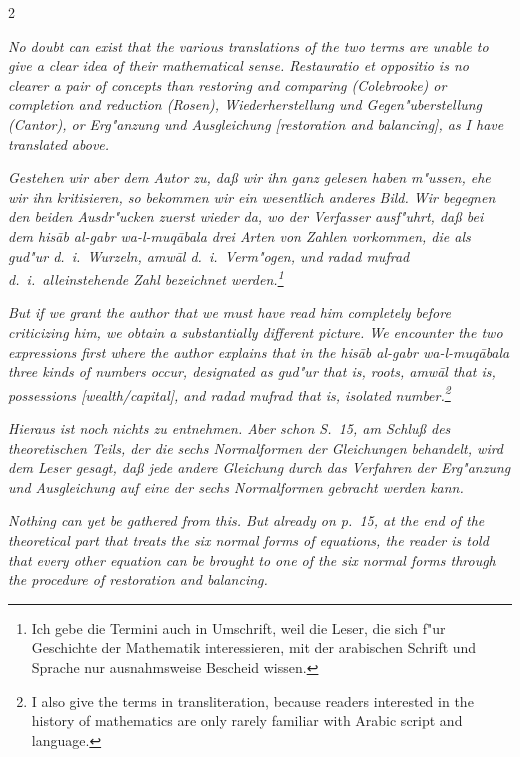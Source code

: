 \documentclass[10pt,a4paper]{article}
\begin{document}
\begin{paracol}{2}
\switchcolumn

\textit{No doubt can exist that the various translations of the two terms are unable to give a clear idea of their mathematical sense. \textit{Restauratio et oppositio} is no clearer a pair of concepts than \textit{restoring and comparing} (Colebrooke) or \textit{completion and reduction} (Rosen), \textit{Wiederherstellung und Gegen"uberstellung} (Cantor), or \textit{Erg"anzung und Ausgleichung} [restoration and balancing], as I have translated above.}

\switchcolumn*

\textit{Gestehen wir aber dem Autor zu, da\ss{} wir ihn ganz gelesen haben m"ussen, ehe wir ihn kritisieren, so bekommen wir ein wesentlich anderes Bild. Wir begegnen den beiden Ausdr"ucken zuerst wieder da, wo der Verfasser ausf"uhrt, da\ss{} bei dem \textit{his\=ab al-gabr wa-l-muq\=abala} drei Arten von Zahlen vorkommen, die als \textit{gud"ur} d.\ i.\ Wurzeln, \textit{amw\=al} d.\ i.\ Verm"ogen, und \textit{radad mufrad} d.\ i.\ alleinstehende Zahl bezeichnet werden.\footnote{Ich gebe die Termini auch in Umschrift, weil die Leser, die sich f"ur Geschichte der Mathematik interessieren, mit der arabischen Schrift und Sprache nur ausnahmsweise Bescheid wissen.}}

\switchcolumn

\textit{But if we grant the author that we must have read him completely before criticizing him, we obtain a substantially different picture. We encounter the two expressions first where the author explains that in the \textit{his\=ab al-gabr wa-l-muq\=abala} three kinds of numbers occur, designated as \textit{gud"ur} that is, roots, \textit{amw\=al} that is, possessions [wealth/capital], and \textit{radad mufrad} that is, isolated number.\footnote{I also give the terms in transliteration, because readers interested in the history of mathematics are only rarely familiar with Arabic script and language.}}

\switchcolumn*

\textit{Hieraus ist noch nichts zu entnehmen. Aber schon S.\ 15, am Schlu\ss{} des theoretischen Teils, der die sechs Normalformen der Gleichungen behandelt, wird dem Leser gesagt, da\ss{} jede andere Gleichung durch das Verfahren der Erg"anzung und Ausgleichung auf eine der sechs Normalformen gebracht werden kann.}

\switchcolumn

\textit{Nothing can yet be gathered from this. But already on p.\ 15, at the end of the theoretical part that treats the six normal forms of equations, the reader is told that every other equation can be brought to one of the six normal forms through the procedure of restoration and balancing.}


\end{paracol}
\end{document}
